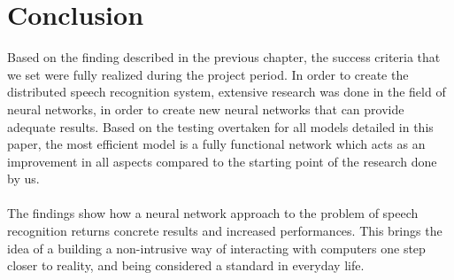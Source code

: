 \chapter{Conclusion}\label{ch:conclusion}
Based on the finding described in the previous chapter, 
the success criteria that we set were fully realized 
during the project period. In order to create the 
distributed speech recognition system, extensive research was done in the field of neural networks, in 
order to create new neural networks that can provide 
adequate results. Based on the testing overtaken for all 
models detailed in this paper, the most efficient model 
is a fully functional network which acts as an 
improvement in all aspects compared to the starting 
point of the research done by us.\\\\
The findings show how a neural network approach to the 
problem of speech recognition returns concrete results 
and increased performances. This brings the idea of a 
building a non-intrusive way of interacting with 
computers one step closer to reality, and being 
considered a standard in everyday life.